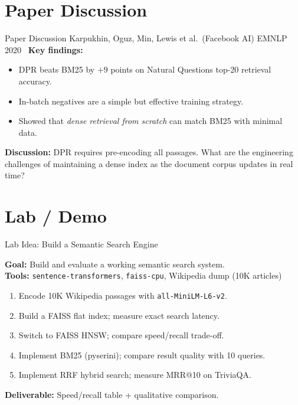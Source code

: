 \documentclass[aspectratio=169,10pt]{beamer}
\begin{document}
\section{Paper Discussion}
\begin{frame}{Paper Discussion}
    {Karpukhin, Oguz, Min, Lewis et al.\ (Facebook AI)}
    {EMNLP 2020~\cite{karpukhin2020dpr}}
  \vspace{0.4em}
  \textbf{Key findings:}
  \begin{itemize}
    \item DPR beats BM25 by $+9$ points on Natural Questions top-20 retrieval accuracy.
    \item In-batch negatives are a simple but effective training strategy.
    \item Showed that \emph{dense retrieval from scratch} can match BM25 with minimal data.
  \end{itemize}
  \vspace{0.3em}
  \textbf{Discussion:} DPR requires pre-encoding all passages. What are the engineering challenges
  of maintaining a dense index as the document corpus updates in real time?
\end{frame}

\section{Lab / Demo}
\begin{frame}{Lab Idea: Build a Semantic Search Engine}
  \begin{tcolorbox}[hitbox, title=Lab 5 — Semantic Search with FAISS]
    \textbf{Goal:} Build and evaluate a working semantic search system.\\[4pt]
    \textbf{Tools:} \texttt{sentence-transformers}, \texttt{faiss-cpu}, Wikipedia dump (10K articles)
    \begin{enumerate}
      \item Encode 10K Wikipedia passages with \texttt{all-MiniLM-L6-v2}.
      \item Build a FAISS flat index; measure exact search latency.
      \item Switch to FAISS HNSW; compare speed/recall trade-off.
      \item Implement BM25 (pyserini); compare result quality with 10 queries.
      \item Implement RRF hybrid search; measure MRR@10 on TriviaQA.
    \end{enumerate}
    \textbf{Deliverable:} Speed/recall table + qualitative comparison.
  \end{tcolorbox}
\end{frame}
\end{document}
